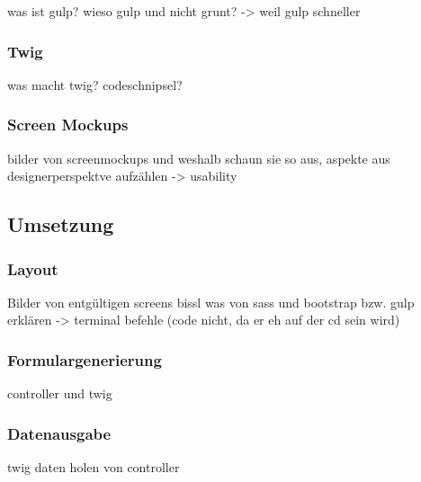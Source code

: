 was ist gulp? wieso gulp und nicht grunt? -> weil gulp schneller

    \subsubsection{Twig}

was macht twig? codeschnipsel?

    \subsubsection{Screen Mockups}

bilder von screenmockups und weshalb schaun sie so aus, aspekte aus designerperspektve aufzählen -> usability

  \subsection{Umsetzung}

    \subsubsection{Layout}

Bilder von entgültigen screens
bissl was von sass und bootstrap bzw. gulp erklären -> terminal befehle (code nicht, da er eh auf der cd sein wird)

    \subsubsection{Formulargenerierung}

controller und twig

    \subsubsection{Datenausgabe}

twig daten holen von controller
